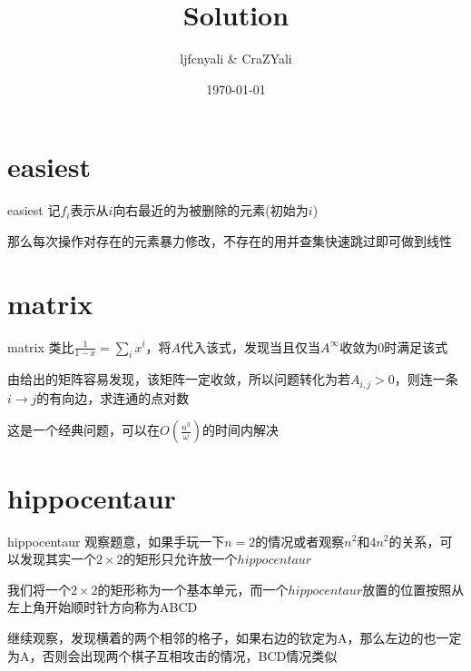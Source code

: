 \documentclass[9pt]{beamer}
\title{Solution}
\date{\today}
\author{ljfcnyali \&  CraZYali}
\begin{document}
  \maketitle
  
  \section{easiest}

  \begin{frame}{easiest}
     记$f_i$表示从$i$向右最近的为被删除的元素(初始为$i$)
    
     那么每次操作对存在的元素暴力修改，不存在的用并查集快速跳过即可做到线性
  \end{frame}

  \section{matrix}

  \begin{frame}{matrix}
     类比$\frac{1}{1-x}=\sum_{i}x^i$，将$A$代入该式，发现当且仅当$A^{\infty}$收敛为0时满足该式
    
     由给出的矩阵容易发现，该矩阵一定收敛，所以问题转化为若$A_{i,j}>0$，则连一条$i\rightarrow j$的有向边，求连通的点对数

     这是一个经典问题，可以在$O(\frac{n^3}{\omega})$的时间内解决
  \end{frame}

  \section{hippocentaur}

  \begin{frame}{hippocentaur}
     观察题意，如果手玩一下$n=2$的情况或者观察$n^2$和$4n^2$的关系，可以发现其实一个$2\times 2$的矩形只允许放一个$hippocentaur$

     我们将一个$2\times 2$的矩形称为一个基本单元，而一个$hippocentaur$放置的位置按照从左上角开始顺时针方向称为ABCD

     继续观察，发现横着的两个相邻的格子，如果右边的钦定为A，那么左边的也一定为A，否则会出现两个棋子互相攻击的情况，BCD情况类似
  \end{frame}
\end{document}

